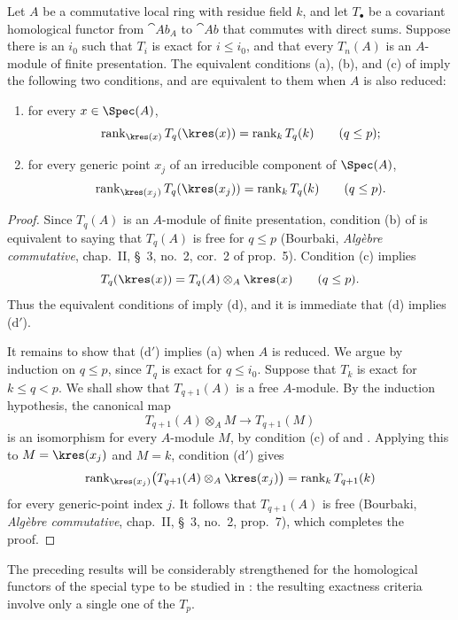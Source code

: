 \begin{proposition}[7.3.11]
\label{III.7.3.11}
Let $A$ be a commutative local ring with residue field $k$,
and let $T_\bullet$ be a covariant homological functor from
$\cat{Ab}_A$ to $\cat{Ab}$ that commutes with direct sums.
Suppose there is an $i_0$ such that $T_i$ is exact for
$i\leq i_0$, and that every $T_n(A)$ is an $A$-module of
finite presentation.  The equivalent conditions (a), (b), and
(c) of  imply the following two conditions,
and are equivalent to them when $A$ is also reduced:
\begin{enumerate}
  \item[(d)] for every $x\in\Spec(A)$,
    \[
      \operatorname{rank}_{\kres(x)}
      T_q(\kres(x))
      =
      \operatorname{rank}_k T_q(k)
      \qquad(q\leq p);
    \]
  \item[($\mathrm{d}'$)] for every generic point $x_j$ of an
    irreducible component of $\Spec(A)$,
    \[
      \operatorname{rank}_{\kres(x_j)}
      T_q(\kres(x_j))
      =
      \operatorname{rank}_k T_q(k)
      \qquad(q\leq p).
    \]
\end{enumerate}
\end{proposition}

\begin{proof}
Since $T_q(A)$ is an $A$-module of finite presentation,
condition (b) of  is equivalent to saying that
$T_q(A)$ is free for $q\leq p$ (Bourbaki,
\emph{Alg\`ebre commutative}, chap.~II, \S~3, no.~2, cor.~2
of prop.~5).  Condition (c) implies
\[
  T_q(\kres(x))
  =
  T_q(A)\otimes_A\kres(x)
  \qquad(q\leq p).
\]
Thus the equivalent conditions of  imply (d),
and it is immediate that (d) implies ($\mathrm{d}'$).

It remains to show that ($\mathrm{d}'$) implies (a) when $A$ is
reduced.  We argue by induction on $q\leq p$, since $T_q$ is
exact for $q\leq i_0$.  Suppose that $T_k$ is exact for
$k\leq q<p$.  We shall show that $T_{q+1}(A)$ is a free
$A$-module.  By the induction hypothesis, the canonical map
\[
  T_{q+1}(A)\otimes_A M
  \longrightarrow
  T_{q+1}(M)
\]
is an isomorphism for every $A$-module $M$, by condition (c) of
 and .  Applying this to
$M=\kres(x_j)$ and $M=k$, condition ($\mathrm{d}'$) gives
\[
  \operatorname{rank}_{\kres(x_j)}
  \bigl(T_{q+1}(A)\otimes_A\kres(x_j)\bigr)
  =
  \operatorname{rank}_k T_{q+1}(k)
\]
for every generic-point index $j$.  It follows that
$T_{q+1}(A)$ is free (Bourbaki,
\emph{Alg\`ebre commutative}, chap.~II, \S~3, no.~2, prop.~7),
which completes the proof.
\end{proof}

The preceding results will be considerably strengthened for
the homological functors of the special type to be studied in
: the resulting exactness criteria involve only
a single one of the $T_p$.
